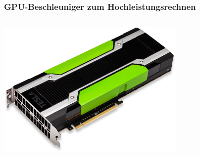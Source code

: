 \begin{frame}
    \frametitle{GPU-Beschleuniger zum Hochleistungsrechnen}
    \begin{columns}\begin{column}{0.5\linewidth}
        \centerline{\includegraphics[height=0.15\textheight]{tesla-3-quater.png}}
    \end{column}\begin{column}{0.5\linewidth}

\end{column}
\end{columns}
\end{frame}
